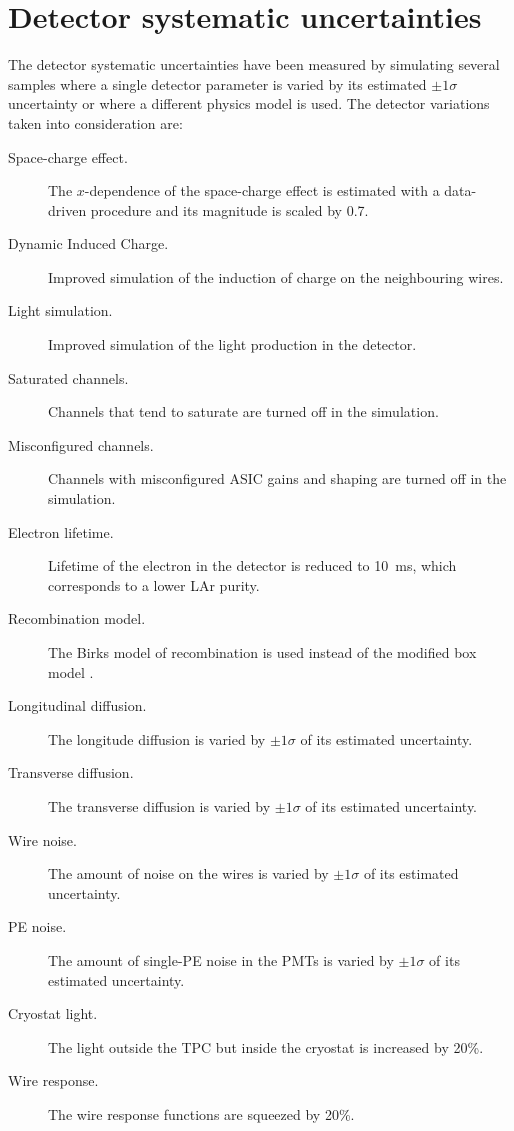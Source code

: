\section{Detector systematic uncertainties}\label{sec:detector_sys}
The detector systematic uncertainties have been measured by simulating several samples where a single detector parameter is varied by its estimated $\pm1\sigma$ uncertainty or where a different physics model is used. The detector variations taken into consideration are:
\begin{description}
\item[Space-charge effect.] The $x$-dependence of the space-charge effect is estimated with a data-driven procedure and its magnitude is scaled by 0.7.
\item[Dynamic Induced Charge.] Improved simulation of the induction of charge on the neighbouring wires.
\item[Light simulation.] Improved simulation of the light production in the detector.
\item[Saturated channels.] Channels that tend to saturate are turned off in the simulation.
\item[Misconfigured channels.] Channels with misconfigured ASIC gains and shaping are turned off in the simulation.
\item[Electron lifetime.] Lifetime of the electron in the detector is reduced to 10~ms, which corresponds to a lower LAr purity.
\item[Recombination model.] The Birks model of recombination \cite{Amoruso:2004dy} is used instead of the modified box model \cite{Acciarri:2013met}. 
\item[Longitudinal diffusion.] The longitude diffusion is varied by $\pm1\sigma$ of its estimated uncertainty.
\item[Transverse diffusion.] The transverse diffusion is varied by $\pm1\sigma$ of its estimated uncertainty.
\item[Wire noise.] The amount of noise on the wires is varied by $\pm1\sigma$ of its estimated uncertainty.
\item[PE noise.] The amount of single-PE noise in the PMTs is varied by $\pm1\sigma$ of its estimated uncertainty.
\item[Cryostat light.] The light outside the TPC but inside the cryostat is increased by 20\%.
\item[Wire response.] The wire response functions are squeezed by 20\%.
\end{description}

